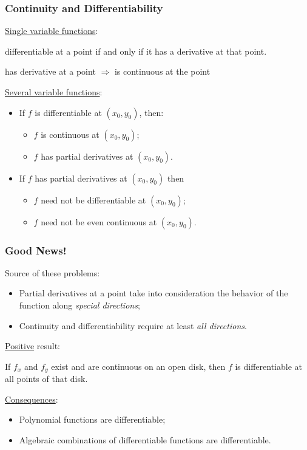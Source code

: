 \begin{frame}
  \frametitle{Continuity and Differentiability}

  \underline{Single variable functions}:

  differentiable at a point if and only if it has a derivative at that point.

  \medskip

  has derivative at a point $\Longrightarrow$ is continuous at the point
  \bigskip

\pause   \underline{Several variable functions}:

\begin{itemize}
  \item If $f$ is differentiable at $(x_0,y_0)$, then:
  \begin{itemize}
    \item $f$ is continuous at $(x_0,y_0)$;
    \item $f$ has partial derivatives at $(x_0,y_0)$.
  \end{itemize}
  \item  If $f$ has partial derivatives at $(x_0,y_0)$ then
  \begin{itemize}
    \item $f$ \textcolor[rgb]{0.98,0.00,0.00}{need not} be differentiable at $(x_0,y_0)$;
    \item $f$ \textcolor[rgb]{0.98,0.00,0.00}{need not be even continuous} at $(x_0,y_0)$.
  \end{itemize}
\end{itemize}
\end{frame}



\begin{frame}
  \frametitle{Good News!}

  Source of these problems:
\begin{itemize}
  \item Partial derivatives at a point take into consideration the behavior of the function along \emph{special directions};
  \item Continuity and differentiability require at least \emph{all directions}.
\end{itemize}

\pause \underline{Positive} result:

\begin{theorem}
   If $f_x$ and $f_y$ exist and are continuous on an open disk, then $f$ is differentiable at all points of that disk.
\end{theorem}

\pause \underline{Consequences}:
\begin{itemize}
  \item Polynomial functions are differentiable;
  \item Algebraic combinations of differentiable functions are differentiable.
\end{itemize}
\end{frame}
